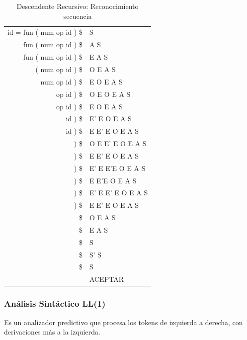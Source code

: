 \documentclass[12pt, twoside, openright]{report} %
\begin{document}
\begin{table}[H]
\centering
\begin{tabular}{r|l}
id = fun ( num op id ) \$ & S                 \\
= fun ( num op id ) \$    & A S               \\
fun ( num op id ) \$      & E A S             \\
( num op id ) \$          & O E A S           \\
num op id ) \$            & E O E A S         \\
op id ) \$                & O E O E A S       \\
op id ) \$                & E O E A S         \\
id ) \$                   & E' E O E A S      \\
id ) \$                   & E E' E O E A S    \\
) \$                      & O E E' E O E A S  \\
) \$                      & E E' E O E A S    \\
) \$                      & E' E E'E O E A S  \\
) \$                      & E E'E O E A S     \\
) \$                      & E' E E' E O E A S \\
) \$                      & E E' E O E A S    \\
\$                        & O E A S           \\
\$                        & E A S             \\
\$                        & S                 \\
\$                        & S' S              \\
\$                        & S                 \\
                          & ACEPTAR          
\end{tabular}
\caption{Descendente Recursivo: Reconocimiento secuencia}
\end{table}

\pagebreak

\subsubsection{Análisis Sintáctico LL(1)}

Es un analizador predictivo que procesa los tokens de izquierda a
derecha, con derivaciones más a la izquierda.
\end{document}
